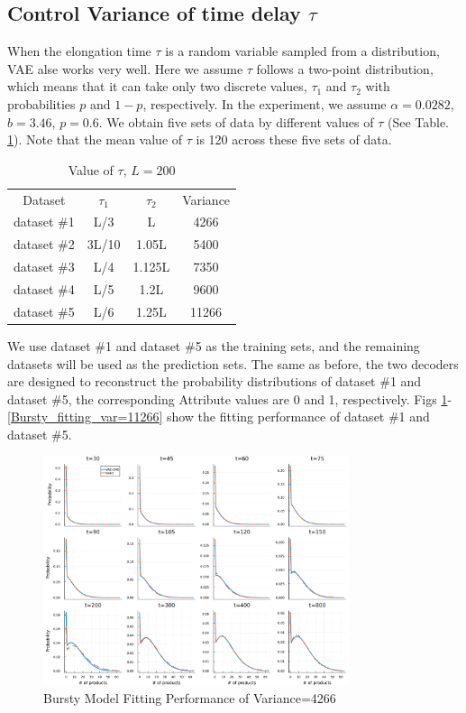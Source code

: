 \documentclass[a4paper,10pt]{article}
\begin{document}
\subsection{Control Variance of time delay $\tau$}
When the elongation time $\tau$ is a random variable sampled from a distribution, VAE alse works very well. Here we assume $\tau$ follows a two-point distribution, which means that it can take only two discrete values, $\tau_1$ and $\tau_2$ with probabilities $p$ and $1-p$, respectively. In the experiment, we assume $\alpha=0.0282$, $b=3.46$, $p=0.6$. We obtain five sets of data by different values of $\tau$ (See Table. \ref{table of tau}). Note that the mean value of $\tau$ is 120 across these five sets of data.
\begin{table}[H]
	\centering
	  \small
	  \begin{tabular}{c|ccc}
		  \toprule
		  Dataset & $\tau_1$ & $\tau_2$ & Variance \\
		  \cmidrule{1-4}
		  dataset \#1 & L/3   & L      & 4266 \\
		  dataset \#2 & 3L/10 & 1.05L  & 5400 \\
		  dataset \#3 & L/4   & 1.125L & 7350 \\
	      dataset \#4 & L/5   & 1.2L   & 9600 \\
	      dataset \#5 & L/6   & 1.25L  & 11266 \\
	  \bottomrule
	  \end{tabular}
	  \caption{Value of $\tau$, $L=200$}
	  \label{table of tau}
\end{table}
We use dataset \#1 and dataset \#5 as the training sets, and the remaining datasets will be used as the prediction sets. The same as before, the two decoders are designed to reconstruct the probability distributions of dataset \#1 and dataset \#5, the corresponding Attribute values are 0 and 1, respectively. Figs \ref{Bursty_fitting_var=4266}-\ref{Bursty_fitting_var=11266} show the fitting performance of dataset \#1 and dataset \#5.
\begin{figure}[p]
	\centering
	\includegraphics[width=0.8\textwidth]{Figs/fit_var=4266.pdf}
	\caption{Bursty Model Fitting Performance of Variance=4266}\label{Bursty_fitting_var=4266}  
\end{figure}
\end{document}
